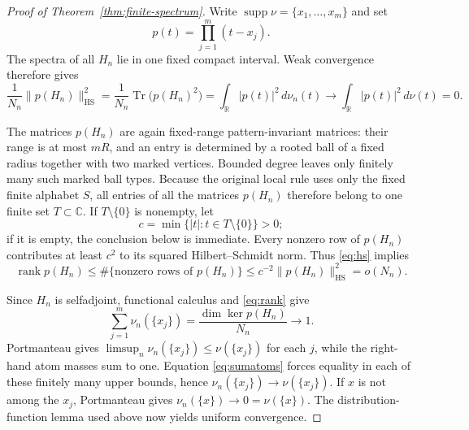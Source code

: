 \documentclass[11pt]{article}
\theoremstyle{definition}
\theoremstyle{remark}
\newcommand{\R}{\mathbb{R}}
\begin{document}
\begin{proof}[Proof of Theorem~\ref{thm:finite-spectrum}]
Write $\operatorname{supp}\nu=\{x_1,\ldots,x_m\}$ and set
\[
                       p(t)=\prod_{j=1}^m(t-x_j).
\]
The spectra of all $H_n$ lie in one fixed compact interval.  Weak convergence
therefore gives
\[
 \frac1{N_n}\|p(H_n)\|_{\mathrm{HS}}^2
 =\frac1{N_n}\operatorname{Tr}\bigl(p(H_n)^2\bigr)
 =\int_{\R}|p(t)|^2\,d\nu_n(t)
 \longrightarrow \int_{\R}|p(t)|^2\,d\nu(t)=0.
\tag{6}\label{eq:hs}
\]

The matrices $p(H_n)$ are again fixed-range pattern-invariant matrices: their
range is at most $mR$, and an entry is determined by a rooted ball of a fixed
radius together with two marked vertices.  Bounded degree leaves only
finitely many such marked ball types.  Because the original local rule uses
only the fixed finite alphabet $S$, all entries of all the matrices $p(H_n)$
therefore belong to one finite set $T\subset\mathbb C$.  If
$T\setminus\{0\}$ is nonempty, let
\[
                c=\min\{|t|:t\in T\setminus\{0\}\}>0;
\]
if it is empty, the conclusion below is immediate.  Every nonzero row of
$p(H_n)$ contributes at least $c^2$ to its squared Hilbert--Schmidt norm.
Thus \eqref{eq:hs} implies
\[
 \operatorname{rank}p(H_n)
 \le \#\{\text{nonzero rows of }p(H_n)\}
 \le c^{-2}\|p(H_n)\|_{\mathrm{HS}}^2=o(N_n).
\tag{7}\label{eq:rank}
\]

Since $H_n$ is selfadjoint, functional calculus and \eqref{eq:rank} give
\[
 \sum_{j=1}^m\nu_n(\{x_j\})
 =\frac{\dim\ker p(H_n)}{N_n}\longrightarrow1.
\tag{8}\label{eq:sumatoms}
\]
Portmanteau gives
$\limsup_n\nu_n(\{x_j\})\le\nu(\{x_j\})$ for each $j$, while the right-hand
atom masses sum to one.  Equation \eqref{eq:sumatoms} forces equality in each
of these finitely many upper bounds, hence
$\nu_n(\{x_j\})\to\nu(\{x_j\})$.  If $x$ is not among the $x_j$, Portmanteau
gives $\nu_n(\{x\})\to0=\nu(\{x\})$.  The distribution-function lemma used
above now yields uniform convergence.
\end{proof}
\end{document}
